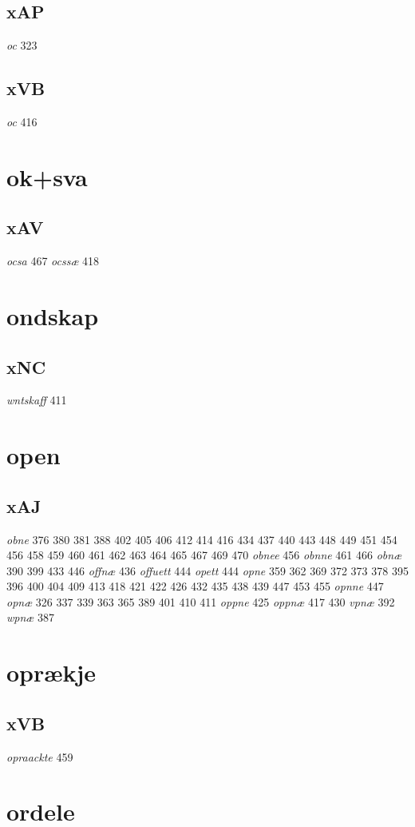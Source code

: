 \documentclass[a4paper,twocolumn]{article}
\begin{document}
\subsection{xAP}
\label{sec:orgec625f8}
\emph{oc} 323 
\subsection{xVB}
\label{sec:orgc1f93ea}
\emph{oc} 416 
\section{ok+sva}
\label{sec:org4d40649}
\subsection{xAV}
\label{sec:orgf1a0351}
\emph{ocsa} 467 \emph{ocssæ} 418 
\section{ondskap}
\label{sec:org35c18f6}
\subsection{xNC}
\label{sec:org7d76fa5}
\emph{wntskaff} 411 
\section{open}
\label{sec:org9e1b916}
\subsection{xAJ}
\label{sec:orgcc22b7a}
\emph{obne} 376 380 381 388 402 405 406 412 414 416 434 437 440 443 448 449 451 454 456 458 459 460 461 462 463 464 465 467 469 470 \emph{obnee} 456 \emph{obnne} 461 466 \emph{obnæ} 390 399 433 446 \emph{offnæ} 436 \emph{offuett} 444 \emph{opett} 444 \emph{opne} 359 362 369 372 373 378 395 396 400 404 409 413 418 421 422 426 432 435 438 439 447 453 455 \emph{opnne} 447 \emph{opnæ} 326 337 339 363 365 389 401 410 411 \emph{oppne} 425 \emph{oppnæ} 417 430 \emph{vpnæ} 392 \emph{wpnæ} 387 
\section{oprækje}
\label{sec:orgb0828f2}
\subsection{xVB}
\label{sec:orgfe9b92f}
\emph{opraackte} 459 
\section{ordele}
\label{sec:orgfd8d6ac}
\end{document}
